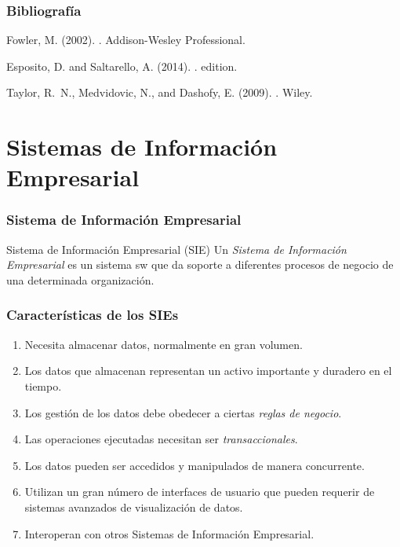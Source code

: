 \documentclass[handout,a4paper,t,xcolor=pst,dvips,colortheme]{beamer}
\begin{document}
\begin{frame}[c]
    \frametitle{Bibliografía}
    \begin{thebibliography}{1}

        Fowler, M. (2002).
        .
        \newblock Addison-Wesley Professional.

        Esposito, D. and Saltarello, A. (2014).
        .
         edition.

        Taylor, R.~N., Medvidovic, N., and Dashofy, E. (2009).
        .
        \newblock Wiley.

    \end{thebibliography}
\end{frame}

\section{Sistemas de Información Empresarial}

\begin{frame}[c]
    \frametitle{Sistema de Información Empresarial}
    \begin{block}{Sistema de Información  Empresarial (SIE)}
        Un \emph{Sistema de Información Empresarial} es un sistema sw que da soporte a diferentes procesos de negocio de una determinada organización.
    \end{block}
\end{frame}

\begin{frame}[c]
    \frametitle{Características de los SIEs}
    \begin{enumerate}[<+->]
        \item Necesita almacenar datos, normalmente en gran volumen.
        \item Los datos que almacenan representan un activo importante y duradero en el tiempo.
        \item Los gestión de los datos debe obedecer a ciertas \emph{reglas de negocio}.
        \item Las operaciones ejecutadas necesitan ser \emph{transaccionales}.
        \item Los datos pueden ser accedidos y manipulados de manera concurrente.
        \item Utilizan un gran número de interfaces de usuario que pueden requerir de sistemas avanzados de visualización de datos.
        \item Interoperan con otros Sistemas de Información Empresarial.
    \end{enumerate}
\end{frame}
\end{document}

